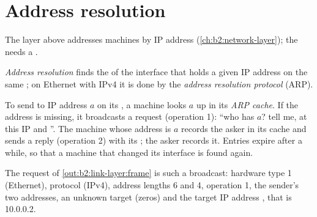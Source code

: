 
\section{Address resolution}\label{sec:b2:link-layer:arp}

The layer above addresses machines by IP address (\cref{ch:b2:network-layer}); the  needs a .

\begin{definition}\label{def:b2:link-layer:arp}
\emph{Address resolution} finds the  of the interface that holds a given
IP address on the same ; on Ethernet with IPv4 it is done by the \emph{address resolution protocol} (ARP).
\end{definition}

\begin{method}[ARP]\label{met:b2:link-layer:arp}
To send to IP address $a$ on its , a machine looks $a$ up in its \emph{ARP cache}. If the address is missing,
it broadcasts a request (operation 1): ``who has $a$? tell me, at this IP and ''. The machine whose
address is $a$ records the asker in its cache and sends a reply (operation 2) with its ; the asker records
it. Entries expire after a while, so that a machine that changed its interface is found again.
\end{method}

The request of \cref{out:b2:link-layer:frame} is such a broadcast: hardware type 1 (Ethernet), protocol
 (IPv4), address lengths 6 and 4, operation 1, the sender's two addresses, an unknown target 
(zeros) and the target IP address , that is 10.0.0.2.


